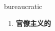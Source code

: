 
\begin{frame}
{\huge bureaucratic}
\begin{center}
\begin{enumerate}\Large
  \item \textbf{官僚主义的}
\end{enumerate}
\end{center}
\end{frame}
